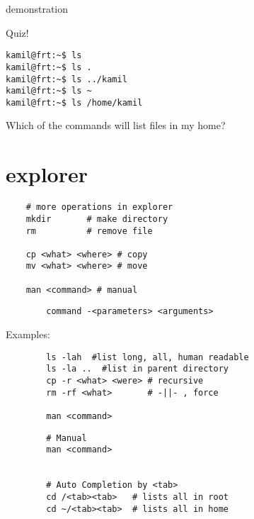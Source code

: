 \documentclass[xcolor=dvipsnames]{beamer}
\begin{document}
\begin{frame}
	\Huge
	\begin{center}
		demonstration
	\end{center}
\end{frame}

\begin{frame}[fragile]
Quiz!
\begin{verbatim}
kamil@frt:~$ ls
kamil@frt:~$ ls .
kamil@frt:~$ ls ../kamil
kamil@frt:~$ ls ~
kamil@frt:~$ ls /home/kamil
\end{verbatim}
Which of the commands will list files in my home?
\end{frame}

\section{explorer}

\begin{frame}[fragile]
\begin{verbatim}
	# more operations in explorer
	mkdir       # make directory
	rm          # remove file

	cp <what> <where> # copy
	mv <what> <where> # move

	man <command> # manual
\end{verbatim}
\end{frame}

\begin{frame}[fragile]
	\begin{verbatim}
		command -<parameters> <arguments>
	\end{verbatim}
	Examples:
	\begin{verbatim}
		ls -lah  #list long, all, human readable
		ls -la ..  #list in parent directory
		cp -r <what> <were> # recursive
		rm -rf <what>       # -||- , force

		man <command>
	\end{verbatim}
\end{frame}

\begin{frame}[fragile]
	\Large
	\begin{verbatim}
		# Manual
		man <command>


		# Auto Completion by <tab>
		cd /<tab><tab>   # lists all in root
		cd ~/<tab><tab>  # lists all in home



	\end{verbatim}
\end{frame}
\end{document}
